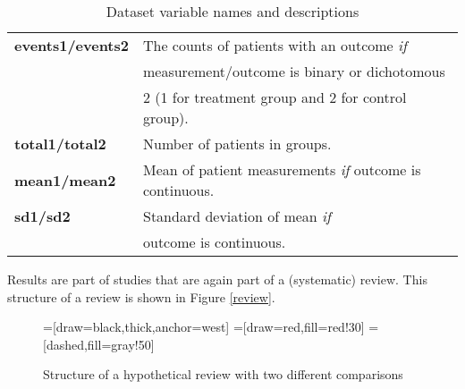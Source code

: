 \begin{table}[ht]
\begin{center}
\begin{tabular}{l l}
      \textbf{events1/events2} & The counts of patients with an outcome \textit{if}\\ &measurement/outcome is binary or dichotomous \\ &2 (1 for treatment group and 2 for control group).\\
      \textbf{total1/total2} & Number of patients in groups.\\
      \textbf{mean1/mean2} & Mean of patient measurements \textit{if} outcome is continuous.\\
      \textbf{sd1/sd2} & Standard deviation of mean \textit{if} \\ &outcome is continuous.
    \end{tabular}
  \caption{Dataset variable names and descriptions  \label{variable}}

  \end{center}
\end{table}

Results are part of studies that are again part of a (systematic) review. This structure of a review is shown in Figure \ref{review}. 

\begin{figure}
=[draw=black,thick,anchor=west]
=[draw=red,fill=red!30]
=[dashed,fill=gray!50]
\caption{Structure of a hypothetical review with two different comparisons\label{review.structure}}
\label{review.structure}
\end{figure}

